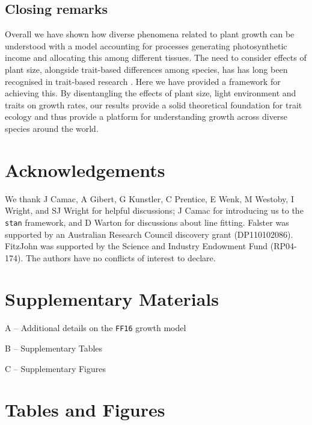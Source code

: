 \documentclass[a4paper,11pt]{article}
\begin{document}
\subsection{Closing remarks}

Overall we have shown how diverse phenomena related to plant growth can be understood with a model accounting for processes generating photosynthetic income and allocating this among different tissues. The need to consider effects of plant size, alongside trait-based differences among species, has has long been recognised in trait-based research \cite[e.g.][]{Givnish-1988, Thomas-1999, Moorcroft-2001, Westoby-2002, Enquist-2007}. Here we have provided a framework for achieving this. By disentangling the effects of plant size, light environment and traits on growth rates, our results provide a solid theoretical foundation for trait ecology and thus provide a platform for understanding growth across diverse species around the world.

\section{Acknowledgements}

We thank J Camac, A Gibert, G Kunstler, C Prentice, E Wenk, M Westoby, I Wright, and SJ Wright for helpful discussions; J Camac for introducing us to the \texttt{stan} framework, and D Warton for discussions about {\sma} line fitting. Falster was supported by an Australian Research Council discovery grant (DP110102086). FitzJohn was supported by the Science and Industry Endowment Fund (RP04-174). The authors have no conflicts of interest to declare.

\section{Supplementary Materials}

\noindent A -- Additional details on the \texttt{FF16} growth model

\noindent B -- Supplementary Tables

\noindent C -- Supplementary Figures

\vspace{10em}

\newpage
\section{Tables and Figures}
\end{document}
